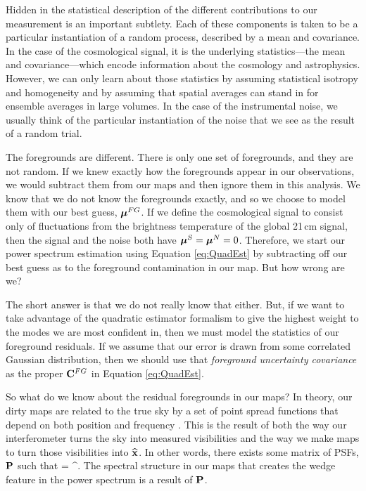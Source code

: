 Hidden in the statistical description of the different contributions to our measurement is an important subtlety. Each of these components is taken to be a particular instantiation of a random process, described by a mean and covariance. In the case of the cosmological signal, it is the underlying statistics---the mean and covariance---which encode information about the cosmology and astrophysics. However, we can only learn about those statistics by assuming statistical isotropy and homogeneity and by assuming that spatial averages can stand in for ensemble averages in large volumes. In the case of the instrumental noise, we usually think of the particular instantiation of the noise that we see as the result of a random trial. 

The foregrounds are different. There is only one set of foregrounds, and they are not random. If we knew exactly how the foregrounds appear in our observations, we would subtract them from our maps and then ignore them in this analysis. We know that we do not know the foregrounds exactly, and so we choose to model them with our best guess, $\boldsymbol\mu^{FG}$. If we define the cosmological signal to consist only of fluctuations from the brightness temperature of the global 21\,cm signal, then the signal and the noise both have $\boldsymbol\mu^S = \boldsymbol\mu^N = 0$. Therefore, we start our power spectrum estimation using Equation \eqref{eq:QuadEst} by subtracting off our best guess as to the foreground contamination in our map. But how wrong are we? 

The short answer is that we do not really know that either. But, if we want to take advantage of the quadratic estimator formalism to give the highest weight to the modes we are most confident in, then we must model the statistics of our foreground residuals. If we assume that our error is drawn from some correlated Gaussian distribution, then we should use that \emph{foreground uncertainty covariance} as the proper $\mathbf{C}^{FG}$ in Equation \eqref{eq:QuadEst}.

So what do we know about the residual foregrounds in our maps? In theory, our dirty maps are related to the true sky by a set of point spread functions that depend on both position and frequency \citep{dillonmapmaking}. This is the result of both the way our interferometer turns the sky into measured visibilities and the way we make maps to turn those visibilities into $\widehat{\mathbf{x}}$. In other words, there exists some matrix of PSFs, $\mathbf{P}$ such that
\beq
\langle \xhat \rangle = \PSF \x^.
\eeq
The spectral structure in our maps that creates the wedge feature in the power spectrum is a result of $\mathbf{P}$.

